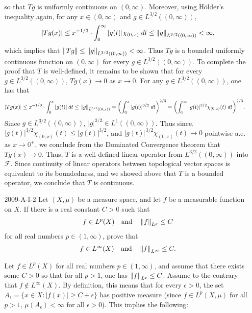\documentclass{article}
\begin{document}
	so that $Tg$ is uniformly continuous on $(0, \infty)$. Moreover, using H\"older's inequality again, for any $x \in (0, \infty)$ and $g \in L^{3/2}((0,\infty))$, 
	\begin{equation*}
		|Tg(x)| \leq x^{-1/3} \cdot \int_{0}^{\infty}|g(t)|\chi_{(0,x)}\;dt \leq \left\Vert g \right\Vert_{L^{3/2}((0,\infty))} < \infty, 
	\end{equation*}
	which implies that $\left\Vert Tg \right\Vert \leq \left\Vert g \right\Vert_{L^{3/2}((0,\infty))} < \infty$. Thus $Tg$ is a bounded uniformly continuous function on $(0, \infty)$ for every $g \in L^{3/2}((0, \infty))$. To complete the proof that $T$ is well-defined, it remains to be shown that for every $g \in L^{3/2}((0, \infty))$, $Tg(x) \to 0$ as $x \to 0$. For any $g \in L^{3/2}((0, \infty))$, one has that 
	\begin{align*}
		\begin{split}
			|Tg(x)| &\leq x^{-1/3} \cdot \int_{0}^{x}|g(t)|\;dt \leq \left\Vert g \right\Vert_{L^{3/2}((0,x))} = \left(\int_{0}^{x}|g(t)|^{3/2}\;dt\right)^{2/3} = \left(\int_{0}^{\infty}|g(t)|^{3/2}\chi_{(0,x)}(t)\;dt\right)^{2/3}. 
		\end{split}
	\end{align*}
	Since $g \in L^{3/2}((0, \infty))$, $|g|^{3/2} \in L^{1}((0, \infty))$. Thus since, $|g(t)|^{3/2}\chi_{(0, x)}(t) \leq |g(t)|^{3/2}$, and $|g(t)|^{3/2}\chi_{(0,x)}(t) \to 0$ pointwise a.e. as $x \to 0^{+}$, we conclude from the Dominated Convergence theorem that $Tg(x) \to 0$. Thus, $T$ is a well-defined linear operator from $L^{3/2}((0, \infty))$ into $\mathscr{F}$. Since continuity of linear operators between topological vector spaces is equivalent to its boundedness, and we showed above that $T$ is a bounded operator, we conclude that $T$ is continuous. 
	\begin{prb}{2009-A-I-2}
		Let $(X,\mu)$ be a measure space, and let $f$ be a measurable function on $X$. If there is a real constant $C > 0$ such that 
		\begin{equation*}
			f \in L^p(X) \quad\text{and} \quad \left\Vert f \right\Vert_{L^p} \leq C
		\end{equation*}
		for all real numbers $p \in (1,\infty)$, prove that 
		\begin{equation*}
			f \in L^\infty(X) \quad \text{and} \quad \left\Vert f \right\Vert_{L^\infty} \leq C. 
		\end{equation*}
	\end{prb}
	Let $f \in L^p(X)$ for all real numbers $p \in (1, \infty)$, and assume that there exists some $C > 0$ so that for all $p > 1$, one has $\left\Vert f \right\Vert_{L^p} \leq C$. Assume to the contrary that $f \notin L^\infty(X)$. By definition, this means that for every $\epsilon > 0$, the set $A_{\epsilon} = \{x \in X: |f(x)| \geq C + \epsilon\}$ has positive measure (since $f\in L^p(X,\mu)$ for all $p > 1$, $\mu(A_{\epsilon}) < \infty$ for all $\epsilon > 0$). This implies the following: 
\end{document}
